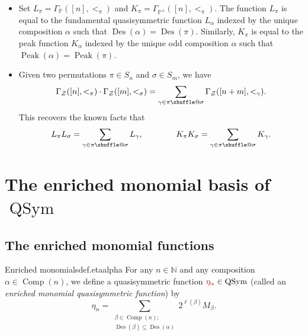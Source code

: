 \documentclass[numbers=enddot,12pt,final,onecolumn,notitlepage]{scrartcl}%
\makeatletter
\newcommand{\al}{\alpha}
\newcommand{\NN}{\mathbb{N}} %
\newcommand{\PP}{\mathbb{P}} %
\newcommand{\QSym}{\operatorname{QSym}}
\newcommand{\Des}{\operatorname{Des}}
\newcommand{\Comp}{\operatorname{Comp}}
\newcommand{\Peak}{\operatorname{Peak}}
\providecommand*{\shuffle}{%
  \mathbin{\mathpalette\shuffle@{}}%
}
\newcommand*{\shuffle@}[2]{%
  \sbox0{$#1\vcenter{}$}%
  \kern .15\ht0 %
  \rlap{\vrule height .25\ht0 depth 0pt width 2.5\ht0}%
  \raise.1\ht0\hbox to 2.5\ht0{%
    \vrule height 1.75\ht0 depth -.1\ht0 width .17\ht0 %
    \hfill
    \vrule height 1.75\ht0 depth -.1\ht0 width .17\ht0 %
    \hfill
    \vrule height 1.75\ht0 depth -.1\ht0 width .17\ht0 %
  }%
  \kern .15\ht0 %
}
\newcommand{\defn}[1]{{\color{darkred}\emph{#1}}}
\newcommand{\defnm}[1]{{\color{darkred} #1}}
\newcommand{\0}{\phantom{c}}
\let\sumnonlimits\sum
\renewcommand{\sum}{\sumnonlimits\limits}
\makeatother
\begin{document}
\begin{itemize}
\item Set $L_{\pi}= \Gamma_{\PP}([n],<_\pi)$ and $K_{\pi}= \Gamma_{\PP^\pm}([n],<_\pi)$. The function $L_\pi$ is equal to the fundamental quasisymmetric function $L_\al$ indexed by the unique composition $\al$ such that $\Des(\al) = \Des(\pi)$. Similarly, $K_\pi$ is equal to the peak function $K_\al$ indexed by the unique odd composition $\al$ such that $\Peak(\al) = \Peak(\pi)$. 

\item Given two permutations $\pi \in S_n$ and $\sigma \in S_m$, we have
\begin{equation}
\label{eq : GGG}
\Gamma_{\mathcal{Z}}([n],<_\pi)
\cdot \Gamma_{\mathcal{Z}}([m],<_\sigma)
= \sum_{\gamma \in \pi \shuffle \sigma}\Gamma_{\mathcal{Z}}([n+m],<_\gamma) .
\end{equation}
This recovers the known facts that
\[
L_{\pi}L_{\sigma} = \sum_{\gamma \in \pi \shuffle \sigma}L_{\gamma}, \qquad\qquad
K_{\pi}K_{\sigma} = \sum_{\gamma \in \pi \shuffle \sigma}K_{\gamma}.
\]
\end{itemize}
\section{The enriched monomial basis of $\QSym$}
\subsection{The enriched monomial functions}

\begin{definition}{Enriched monomials}{def.etaalpha}
For any $n\in\NN$ and any composition $\alpha
\in \Comp(n)$, we define a quasisymmetric function
$\defnm{\eta_{\alpha}}\in\QSym$ (called an
\defn{enriched monomial quasisymmetric function}) by
\begin{equation}
\eta_{\alpha}=\sum_{\substack{\beta\in \Comp(n);\\
\Des\left(  \beta\right)  \subseteq \Des\left(  \alpha\right)  }}2^{\ell\left(
\beta\right)  }M_{\beta}. \label{eq.def.etaalpha.def}%
\end{equation}

\end{definition}
\end{document}

